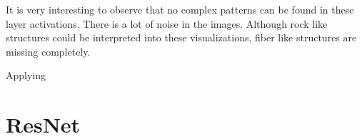 \begin{figure}[H]
\label{fig:vgg13_fromscratch_filters}
\end{figure}

It is very interesting to observe that no complex patterns can be found in these layer activations. There is a lot of noise in the images. Although rock like structures could be interpreted into these visualizations, fiber like structures are missing completely.

Applying 











\section{ResNet}

